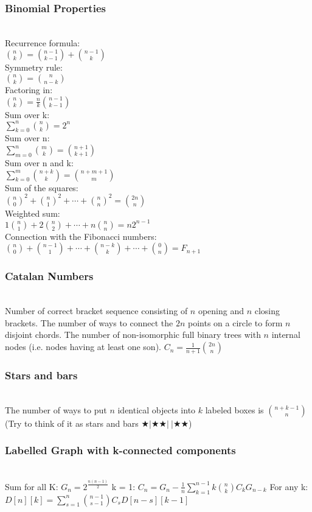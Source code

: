 \subsubsection{Binomial Properties}\\

Recurrence formula:\\
$\binom n k = \binom {n-1} {k-1} + \binom {n-1} k$\\
Symmetry rule:\\
$\binom n k = \binom n {n-k}$\\
Factoring in:\\
$\binom n k = \frac n k \binom {n-1} {k-1}$\\
Sum over k:\\
$\sum_{k = 0}^n \binom n k = 2 ^ n$\\
Sum over n:\\
$\sum_{m = 0}^n \binom m k = \binom {n + 1} {k + 1}$\\
Sum over n and k:\\
$\sum_{k = 0}^m  \binom {n + k} k = \binom {n + m + 1} m$\\
Sum of the squares:\\
${\binom n 0}^2 + {\binom n 1}^2 + \cdots + {\binom n n}^2 = \binom {2n} n$\\
Weighted sum:\\
$1 \binom n 1 + 2 \binom n 2 + \cdots + n \binom n n = n 2^{n-1}$\\
Connection with the Fibonacci numbers:\\
$\binom n 0 + \binom {n-1} 1 + \cdots + \binom {n-k} k + \cdots + \binom 0 n = F_{n+1}$\\

\subsubsection{Catalan Numbers}\\
Number of correct bracket sequence consisting of $n$ opening and $n$ closing brackets.
The number of ways to connect the $2n$ points on a circle to form $n$ disjoint chords.
The number of non-isomorphic full binary trees with $n$ internal nodes (i.e. nodes having at least one son).
$C_n = \frac{1}{n + 1} {\binom{2n}{n}}$

\subsubsection{Stars and bars}\\
The number of ways to put $n$ identical objects into $k$ labeled boxes is
$\binom{n + k - 1}{n}$
(Try to think of it as stars and bars $\bigstar | \bigstar \bigstar |~| \bigstar \bigstar$)


\subsubsection{Labelled Graph with k-connected components}\\
Sum for all K:
$G_n = 2^{\frac{n(n-1)}{2}}$
k = 1:
$C_n = G_n - \frac{1}{n} \sum_{k=1}^{n-1} k \binom{n}{k} C_k G_{n-k}$
For any k:
$D[n][k] = \sum_{s=1}^{n} \binom{n-1}{s-1} C_s D[n-s][k-1]$